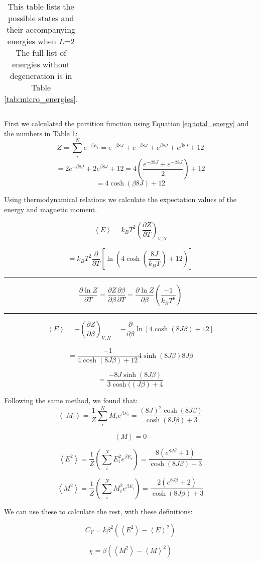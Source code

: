 \begin{table}[H]
	\caption{This table lists the possible states and their accompanying energies when $L$=2 The full list of energies without degeneration is in Table \ref{tab:micro_energies}.}
	\label{tab:macro_energies}
\begin{tabular}{cccccc}
	
\end{tabular}
\end{table}

First we calculated the partition function using Equation \ref{eq:total_energy} and the numbers in Table \ref{tab:macro_energies}:
\[
Z = \sum_i^N e^{-\beta E_i} = e^{-\beta 8 J} + e^{-\beta 8 J} + e^{\beta 8 J}+e^{\beta 8 J} + 12
\]
\[
= 2e^{-\beta 8 J}+ 2e^{\beta 8 J} + 12 = 4\left(\frac{e^{-\beta 8 J}+ e^{-\beta 8 J}}{2}\right)+12
\]
\[
= 4 \cosh\left( \beta 8 J \right) + 12
\]

Using thermodynamical relations we calculate the expectation values of the energy and magnetic moment\cite{thermal}.

\[
\left< E \right> = k_B T^2 \left(\frac{\partial Z}{\partial T}
\right)_{V,N}
\]

\[
= k_B T^2 \frac{\partial}{\partial T} \left[\ln \left(4\cosh \left(\frac{8J}{k_BT}\right) +12\right) \right]\]
\hrule
\[
\frac{\partial \ln Z}{\partial T} = \frac{\partial Z}{\partial \beta}\frac{\partial \beta}{\partial T} = \frac{\partial \ln Z}{\partial \beta}\left(\frac{-1}{k_B T^2}\right)
\]
\hrule
\[
\left< E\right> = -\left(\frac{\partial Z}{\partial \beta} \right)_{V,N} = - \frac{\partial}{\partial \beta} \ln \left[ 4 \cosh \left( 8J\beta\right)+12\right]
\]

\[
= \frac{-1}{4\cosh (8J\beta) + 12}4 \sinh(8J\beta)8J\beta
\]

\[
= \frac{-8J \sinh(8J\beta)}{3\cosh((J\beta)+ 4}
\]

Following the same method, we found that:
\[
\left< |M| \right> = \frac{1}{Z} \sum_i^N M_i e^{\beta E_i}  = \frac{(8J)^2 \cosh(8J\beta )}{\cosh (8J\beta ) + 3}
\]

\[
\left< M \right> = 0
\]

\[
\left< E^2 \right> = \frac{1}{Z} \left( \sum_i^N E_i^2 e^{\beta E_i}\right) =\frac{8 \left( e^{8J\beta } + 1\right) }{\cosh (8J\beta ) + 3}
\]


\[
\left< M^2 \right> = \frac{1}{Z} \left( \sum_i^N M_i^2 e^{\beta E_i}\right) = \frac{2 \left( e^{8J\beta } + 2\right) }{\cosh (8J\beta ) + 3}
\]

We can use these to calculate the rest, with these definitions:

\[
C_V = k \beta^2\left( \left< E^2\right> - \left< E\right>^2 \right)
\]

\[
\chi = \beta \left( \left< M^2\right> - \left< M\right>^2\right)
\]